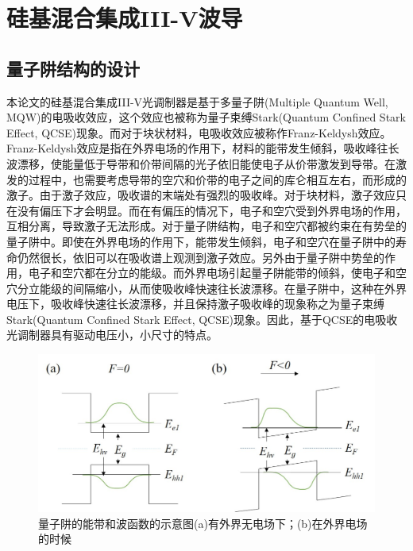 \chapter{硅基混合集成III-V波导}
\section{量子阱结构的设计}
本论文的硅基混合集成III-V光调制器是基于多量子阱(Multiple Quantum Well, MQW)的电吸收效应，这个效应也被称为量子束缚Stark(Quantum Confined Stark Effect, QCSE)现象。而对于块状材料，电吸收效应被称作Franz-Keldysh效应\cite{keldysh1958effect,franz1958einfluss}。Franz-Keldysh效应是指在外界电场的作用下，材料的能带发生倾斜，吸收峰往长波漂移，使能量低于导带和价带间隔的光子依旧能使电子从价带激发到导带。在激发的过程中，也需要考虑导带的空穴和价带的电子之间的库仑相互左右，而形成的激子。由于激子效应，吸收谱的末端处有强烈的吸收峰。对于块材料，激子效应只在没有偏压下才会明显。而在有偏压的情况下，电子和空穴受到外界电场的作用，互相分离，导致激子无法形成。对于量子阱结构，电子和空穴都被约束在有势垒的量子阱中。即使在外界电场的作用下，能带发生倾斜，电子和空穴在量子阱中的寿命仍然很长，依旧可以在吸收谱上观测到激子效应。另外由于量子阱中势垒的作用，电子和空穴都在分立的能级。而外界电场引起量子阱能带的倾斜，使电子和空穴分立能级的间隔缩小，从而使吸收峰快速往长波漂移。在量子阱中，这种在外界电压下，吸收峰快速往长波漂移，并且保持激子吸收峰的现象称之为量子束缚Stark(Quantum Confined Stark Effect, QCSE)现象\cite{miller1984band,miller1985electric}。因此，基于QCSE的电吸收光调制器具有驱动电压小，小尺寸的特点。

\begin{figure}[htb]
	\centering
	\includegraphics[width=14cm]{./Pictures/fig_ch2_band_lineup.jpg}
	\caption{ 量子阱的能带和波函数的示意图(a)有外界无电场下；(b)在外界电场的时候}
	\label{fig_ch2_band_lineup}
\end{figure}

